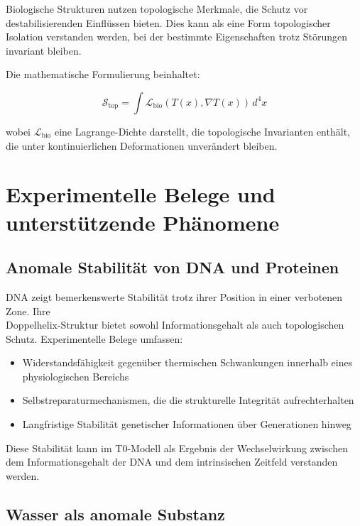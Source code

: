 \documentclass[12pt,a4paper]{article}
\newcommand{\Tfield}{T(x)}
\begin{document}
	Biologische Strukturen nutzen topologische Merkmale, die Schutz vor destabilisierenden Einflüssen bieten. Dies kann als eine Form topologischer Isolation verstanden werden, bei der bestimmte Eigenschaften trotz Störungen invariant bleiben.
	
	Die mathematische Formulierung beinhaltet:
	
	\begin{equation}
		\mathcal{S}_{\text{top}} = \int \mathcal{L}_{\text{bio}}(\Tfield, \nabla\Tfield) \, d^4x
	\end{equation}
	
	wobei \(\mathcal{L}_{\text{bio}}\) eine Lagrange-Dichte darstellt, die topologische Invarianten enthält, die unter kontinuierlichen Deformationen unverändert bleiben.
	
	\section{Experimentelle Belege und unterstützende Phänomene}
	\label{sec:experimental_evidence}
	
	\subsection{Anomale Stabilität von DNA und Proteinen}
	\label{subsec:dna_stability}
	
	DNA zeigt bemerkenswerte Stabilität trotz ihrer Position in einer verbotenen Zone. Ihre \\Doppelhelix-Struktur bietet sowohl Informationsgehalt als auch topologischen Schutz. Experimentelle Belege umfassen:
	
	\begin{itemize}
		\item Widerstandsfähigkeit gegenüber thermischen Schwankungen innerhalb eines physiologischen Bereichs
		\item Selbstreparaturmechanismen, die die strukturelle Integrität aufrechterhalten
		\item Langfristige Stabilität genetischer Informationen über Generationen hinweg
	\end{itemize}
	
	Diese Stabilität kann im T0-Modell als Ergebnis der Wechselwirkung zwischen dem Informationsgehalt der DNA und dem intrinsischen Zeitfeld verstanden werden.
	
	\subsection{Wasser als anomale Substanz}
	\label{subsec:water_anomalies}
	
\end{document}
